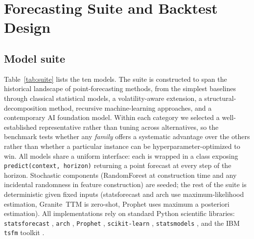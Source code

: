 \documentclass[conference]{IEEEtran}
\begin{document}
\section{Forecasting Suite and Backtest Design}
\label{sec:suite}

\subsection{Model suite}

Table~\ref{tab:suite} lists the ten models. The suite is constructed
to span the historical landscape of point-forecasting methods, from
the simplest baselines through classical statistical models, a
volatility-aware extension, a structural-decomposition method,
recursive machine-learning approaches, and a contemporary AI
foundation model. Within each category we selected a well-established
representative rather than tuning across alternatives, so the
benchmark tests whether any \emph{family} offers a systematic
advantage over the others rather than whether a particular instance
can be hyperparameter-optimized to win. All models share a
uniform interface: each is wrapped in a class exposing
\verb|predict(context, horizon)| returning a point forecast at every
step of the horizon. Stochastic components (RandomForest at
construction time and any incidental randomness in feature
construction) are seeded; the rest of the suite is deterministic
given fixed inputs (statsforecast and arch use maximum-likelihood
estimation, Granite~TTM is zero-shot, Prophet uses maximum a
posteriori estimation). All implementations rely on standard Python
scientific libraries: \texttt{statsforecast}
\cite{garza2022statsforecast}, \texttt{arch} \cite{sheppard2024arch},
\texttt{Prophet} \cite{taylor2018forecasting}, \texttt{scikit-learn}
\cite{pedregosa2011scikit}, \texttt{statsmodels}
\cite{seabold2010statsmodels}, and the IBM \texttt{tsfm} toolkit
\cite{ekambaram2024ttm}.
\end{document}
